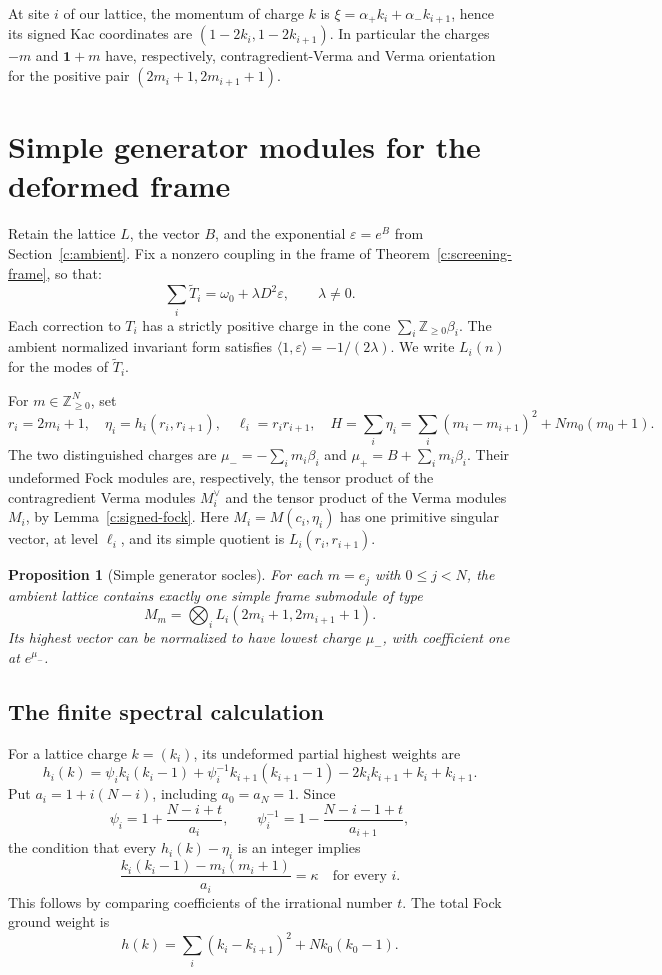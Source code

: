 \documentclass[11pt,a4paper]{article}
\numberwithin{equation}{section}
\newtheorem{proposition}[theorem]{Proposition}
\theoremstyle{definition}\newtheorem{definition}[theorem]{Definition}
\theoremstyle{remark}\newtheorem{remark}[theorem]{Remark}
\begin{document}
At site $i$ of our lattice, the momentum of charge $k$ is
$\xi=\alpha_+k_i+\alpha_-k_{i+1}$, hence its signed Kac coordinates
are $(1-2k_i,1-2k_{i+1})$.  In particular the charges $-m$ and
$\mathbf1+m$ have, respectively, contragredient-Verma and Verma
orientation for the positive pair $(2m_i+1,2m_{i+1}+1)$.


\section{Simple generator modules for the deformed frame}\label{c:sec:uniform-socle}

Retain the lattice $L$, the vector $B$, and the exponential
$\varepsilon=e^B$ from Section~\ref{c:ambient}. Fix a nonzero coupling
in the frame of Theorem~\ref{c:screening-frame}, so that:
\[
 \sum_i\widetilde T_i=\omega_0+\lambda D^2\varepsilon,
 \qquad \lambda\ne0.
\]
Each correction to $T_i$ has a strictly positive charge in the cone
$\sum_i\mathbb Z_{\geq0}\beta_i$.  The ambient normalized invariant form
satisfies $\langle1,\varepsilon\rangle=-1/(2\lambda)$.
We write $L_i(n)$ for the modes of $\widetilde T_i$.

For $m\in\mathbb Z_{\geq0}^N$, set
\[
 r_i=2m_i+1,\quad
 \eta_i=h_i(r_i,r_{i+1}),\quad
 \ell_i=r_ir_{i+1},\quad
 H=\sum_i \eta_i=\sum_i(m_i-m_{i+1})^2+Nm_0(m_0+1).
\]
The two distinguished charges are $\mu_-=-\sum_i m_i\beta_i$ and
$\mu_+=B+\sum_i m_i\beta_i$.  Their undeformed Fock modules are,
respectively, the tensor product of the contragredient Verma modules
$M_i^\vee$ and the tensor product of the Verma modules $M_i$, by Lemma~\ref{c:signed-fock}.
Here $M_i=M(c_i,\eta_i)$ has one primitive singular vector, at level
$\ell_i$, and its simple quotient is $L_i(r_i,r_{i+1})$.

\begin{proposition}[Simple generator socles]\label{c:generator-socles}
For each $m=e_j$ with $0\leq j<N$, the ambient lattice contains exactly one
simple frame submodule of type
\[
 M_m=\bigotimes_i L_i(2m_i+1,2m_{i+1}+1).
\]
Its highest vector can be normalized to have lowest charge $\mu_-$,
with coefficient one at $e^{\mu_-}$.
\end{proposition}

\subsection*{The finite spectral calculation}
For a lattice charge $k=(k_i)$, its undeformed partial highest weights are
\[
 h_i(k)=\psi_i k_i(k_i-1)+\psi_i^{-1}k_{i+1}(k_{i+1}-1)
             -2k_ik_{i+1}+k_i+k_{i+1}.
\]
Put $a_i=1+i(N-i)$, including $a_0=a_N=1$.  Since
\[
 \psi_i=1+\frac{N-i+t}{a_i},\qquad
 \psi_i^{-1}=1-\frac{N-i-1+t}{a_{i+1}},
\]
the condition that every $h_i(k)-\eta_i$ is an integer implies
\begin{equation}\label{c:socle-common-C}
 \frac{k_i(k_i-1)-m_i(m_i+1)}{a_i}=\kappa\quad\text{for every }i.
\end{equation}
This follows by comparing coefficients of the irrational number $t$.
The total Fock ground weight is
\[
 h(k)=\sum_i(k_i-k_{i+1})^2+Nk_0(k_0-1).
\]
\end{document}
